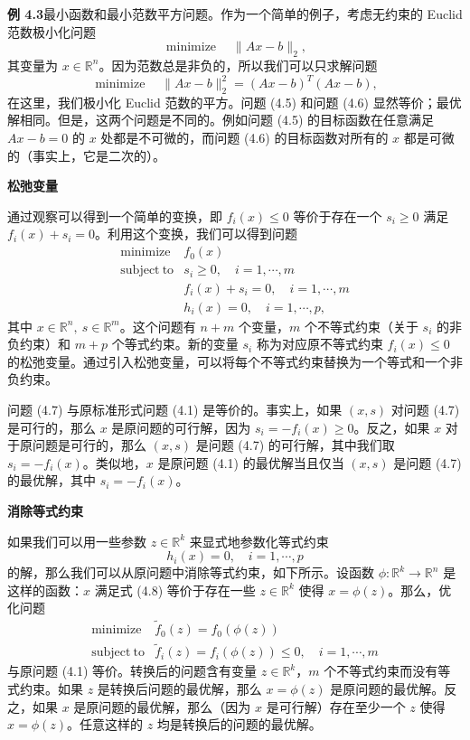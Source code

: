 \documentclass[UTF8, 12pt, fontset=fandol, oneside]{ctexart}
\begin{document}
\noindent\textbf{例 4.3}\quad 最小函数和最小范数平方问题。作为一个简单的例子，考虑无约束的 Euclid 范数极小化问题
\begin{equation}
\mathop{\mathrm{minimize}}\quad \|Ax-b\|_2,
\tag{4.5}
\end{equation}
其变量为 $x\in\mathbb{R}^n$。因为范数总是非负的，所以我们可以只求解问题
\begin{equation}
\mathop{\mathrm{minimize}}\quad \|Ax-b\|_2^2=(Ax-b)^T(Ax-b),
\tag{4.6}
\end{equation}
在这里，我们极小化 Euclid 范数的平方。问题 (4.5) 和问题 (4.6) 显然等价；最优解相同。但是，这两个问题是不同的。例如问题 (4.5) 的目标函数在任意满足 $Ax-b=0$ 的 $x$ 处都是不可微的，而问题 (4.6) 的目标函数对所有的 $x$ 都是可微的（事实上，它是二次的）。

\noindent\textbf{松弛变量}

通过观察可以得到一个简单的变换，即 $f_i(x)\leq 0$ 等价于存在一个 $s_i\geq 0$ 满足 $f_i(x)+s_i=0$。利用这个变换，我们可以得到问题
\begin{equation}
\begin{array}{ll}
\mathop{\mathrm{minimize}} & f_0(x)\\
\mathrm{subject\ to} & s_i\geq 0,\quad i=1,\cdots,m\\
& f_i(x)+s_i=0,\quad i=1,\cdots,m\\
& h_i(x)=0,\quad i=1,\cdots,p,
\end{array}
\tag{4.7}
\end{equation}
其中 $x\in\mathbb{R}^n,\ s\in\mathbb{R}^m$。这个问题有 $n+m$ 个变量，$m$ 个不等式约束（关于 $s_i$ 的非负约束）和 $m+p$ 个等式约束。新的变量 $s_i$ 称为对应原不等式约束 $f_i(x)\leq 0$ 的松弛变量。通过引入松弛变量，可以将每个不等式约束替换为一个等式和一个非负约束。

问题 (4.7) 与原标准形式问题 (4.1) 是等价的。事实上，如果 $(x,s)$ 对问题 (4.7) 是可行的，那么 $x$ 是原问题的可行解，因为 $s_i=-f_i(x)\geq 0$。反之，如果 $x$ 对于原问题是可行的，那么 $(x,s)$ 是问题 (4.7) 的可行解，其中我们取 $s_i=-f_i(x)$。类似地，$x$ 是原问题 (4.1) 的最优解当且仅当 $(x,s)$ 是问题 (4.7) 的最优解，其中 $s_i=-f_i(x)$。

\noindent\textbf{消除等式约束}

如果我们可以用一些参数 $z\in\mathbb{R}^k$ 来显式地参数化等式约束
\begin{equation}
h_i(x)=0,\quad i=1,\cdots,p
\tag{4.8}
\end{equation}
的解，那么我们可以从原问题中消除等式约束，如下所示。设函数 $\phi:\mathbb{R}^k\to\mathbb{R}^n$ 是这样的函数：$x$ 满足式 (4.8) 等价于存在一些 $z\in\mathbb{R}^k$ 使得 $x=\phi(z)$。那么，优化问题
\[
\begin{array}{ll}
\mathop{\mathrm{minimize}} & \tilde{f}_0(z)=f_0(\phi(z))\\
\mathrm{subject\ to} & \tilde{f}_i(z)=f_i(\phi(z))\leq 0,\quad i=1,\cdots,m
\end{array}
\]
与原问题 (4.1) 等价。转换后的问题含有变量 $z\in\mathbb{R}^k$，$m$ 个不等式约束而没有等式约束。如果 $z$ 是转换后问题的最优解，那么 $x=\phi(z)$ 是原问题的最优解。反之，如果 $x$ 是原问题的最优解，那么（因为 $x$ 是可行解）存在至少一个 $z$ 使得 $x=\phi(z)$。任意这样的 $z$ 均是转换后的问题的最优解。
\end{document}
